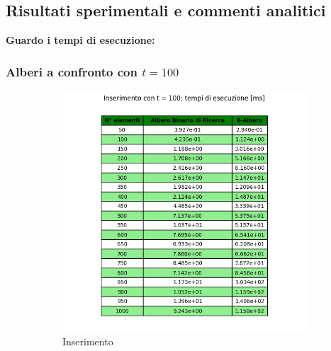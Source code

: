 \newpage
\subsection{Risultati sperimentali e commenti analitici}
\label{sec:RisultatiSperimentaliCommentiAnalitici_1}

\textbf{Guardo i tempi di esecuzione:}

\subsubsection{Alberi a confronto con $t = 100$}

\begin{figure}[H]
    \centering
    \begin{subfigure}[b]{0.49\textwidth}
        \centering
        \includegraphics[width=\textwidth]{tables/insert-ms-t100.png}
        \caption{Inserimento}
        \label{fig:tableinserttimet100}
    \end{subfigure}
    \hfill
    \begin{subfigure}[b]{0.49\textwidth}
        \centering

\end{subfigure}
\end{figure}
